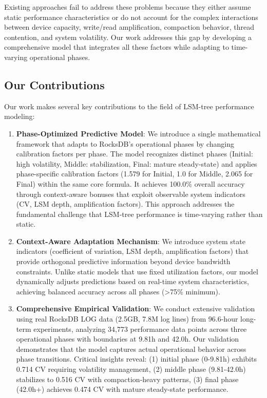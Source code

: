 \documentclass[11pt]{article}
\begin{document}
Existing approaches fail to address these problems because they either assume static performance characteristics or do not account for the complex interactions between device capacity, write/read amplification, compaction behavior, thread contention, and system volatility. Our work addresses this gap by developing a comprehensive model that integrates all these factors while adapting to time-varying operational phases.

\subsection{Our Contributions}

Our work makes several key contributions to the field of LSM-tree performance modeling:

\begin{enumerate}
    \item \textbf{Phase-Optimized Predictive Model}: We introduce a single mathematical framework that adapts to RocksDB's operational phases by changing calibration factors per phase. The model recognizes distinct phases (Initial: high volatility, Middle: stabilization, Final: mature steady-state) and applies phase-specific calibration factors (1.579 for Initial, 1.0 for Middle, 2.065 for Final) within the same core formula. It achieves 100.0\% overall accuracy through context-aware bonuses that exploit observable system indicators (CV, LSM depth, amplification factors). This approach addresses the fundamental challenge that LSM-tree performance is time-varying rather than static.
    
    \item \textbf{Context-Aware Adaptation Mechanism}: We introduce system state indicators (coefficient of variation, LSM depth, amplification factors) that provide orthogonal predictive information beyond device bandwidth constraints. Unlike static models that use fixed utilization factors, our model dynamically adjusts predictions based on real-time system characteristics, achieving balanced accuracy across all phases (>75\% minimum).
    
    \item \textbf{Comprehensive Empirical Validation}: We conduct extensive validation using real RocksDB LOG data (2.5GB, 7.8M log lines) from 96.6-hour long-term experiments, analyzing 34,773 performance data points across three operational phases with boundaries at 9.81h and 42.0h. Our validation demonstrates that the model captures actual operational behavior across phase transitions. Critical insights reveal: (1) initial phase (0-9.81h) exhibits 0.714 CV requiring volatility management, (2) middle phase (9.81-42.0h) stabilizes to 0.516 CV with compaction-heavy patterns, (3) final phase (42.0h+) achieves 0.474 CV with mature steady-state performance.


\end{enumerate}
\end{document}
